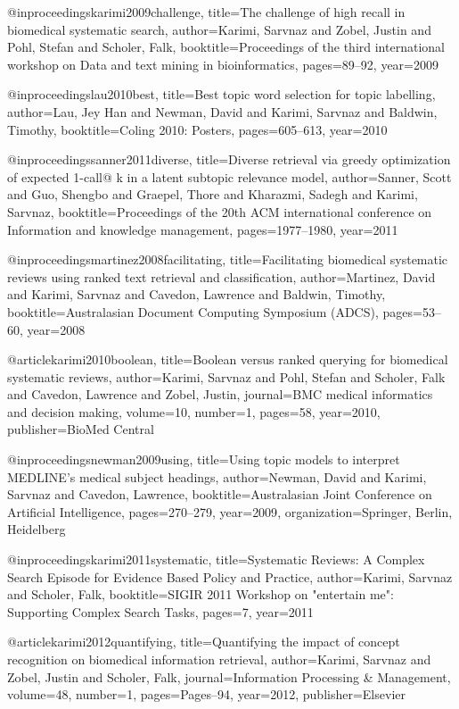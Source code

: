 @inproceedings{karimi2009challenge,
  title={The challenge of high recall in biomedical systematic search},
  author={Karimi, Sarvnaz and Zobel, Justin and Pohl, Stefan and Scholer, Falk},
  booktitle={Proceedings of the third international workshop on Data and text mining in bioinformatics},
  pages={89--92},
  year={2009}
}

@inproceedings{lau2010best,
  title={Best topic word selection for topic labelling},
  author={Lau, Jey Han and Newman, David and Karimi, Sarvnaz and Baldwin, Timothy},
  booktitle={Coling 2010: Posters},
  pages={605--613},
  year={2010}
}

@inproceedings{sanner2011diverse,
  title={Diverse retrieval via greedy optimization of expected 1-call@ k in a latent subtopic relevance model},
  author={Sanner, Scott and Guo, Shengbo and Graepel, Thore and Kharazmi, Sadegh and Karimi, Sarvnaz},
  booktitle={Proceedings of the 20th ACM international conference on Information and knowledge management},
  pages={1977--1980},
  year={2011}
}

@inproceedings{martinez2008facilitating,
  title={Facilitating biomedical systematic reviews using ranked text retrieval and classification},
  author={Martinez, David and Karimi, Sarvnaz and Cavedon, Lawrence and Baldwin, Timothy},
  booktitle={Australasian Document Computing Symposium (ADCS)},
  pages={53--60},
  year={2008}
}

@article{karimi2010boolean,
  title={Boolean versus ranked querying for biomedical systematic reviews},
  author={Karimi, Sarvnaz and Pohl, Stefan and Scholer, Falk and Cavedon, Lawrence and Zobel, Justin},
  journal={BMC medical informatics and decision making},
  volume={10},
  number={1},
  pages={58},
  year={2010},
  publisher={BioMed Central}
}

@inproceedings{newman2009using,
  title={Using topic models to interpret MEDLINE’s medical subject headings},
  author={Newman, David and Karimi, Sarvnaz and Cavedon, Lawrence},
  booktitle={Australasian Joint Conference on Artificial Intelligence},
  pages={270--279},
  year={2009},
  organization={Springer, Berlin, Heidelberg}
}

@inproceedings{karimi2011systematic,
  title={Systematic Reviews: A Complex Search Episode for Evidence Based Policy and Practice},
  author={Karimi, Sarvnaz and Scholer, Falk},
  booktitle={SIGIR 2011 Workshop on "entertain me": Supporting Complex Search Tasks},
  pages={7},
  year={2011}
}

@article{karimi2012quantifying,
  title={Quantifying the impact of concept recognition on biomedical information retrieval},
  author={Karimi, Sarvnaz and Zobel, Justin and Scholer, Falk},
  journal={Information Processing \& Management},
  volume={48},
  number={1},
  pages={Pages--94},
  year={2012},
  publisher={Elsevier}
}

